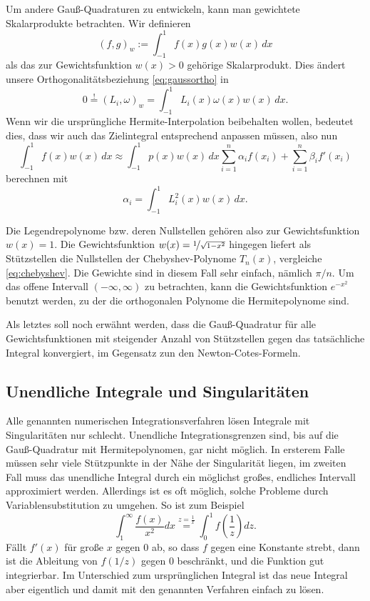 Um andere Gauß-Quadraturen zu entwickeln, kann man gewichtete
Skalarprodukte betrachten. Wir definieren
\begin{equation}
  (f,g)_w := \int_{-1}^1 f(x)g(x)w(x)\, dx
\end{equation}
als das zur Gewichtsfunktion $w(x)>0$ gehörige Skalarprodukt. Dies
ändert unsere Orthogonalitätsbeziehung \eqref{eq:gaussortho} in
\begin{equation}
  0 \stackrel{!}{=} (L_i,\omega)_w = \int_{-1}^1 L_i(x)\omega(x)w(x)\, dx.
\end{equation}
Wenn wir die ursprüngliche Hermite-Interpolation beibehalten wollen,
bedeutet dies, dass wir auch das Zielintegral entsprechend anpassen
müssen, also nun
\begin{equation}
  \int_{-1}^1 f(x) w(x)\, dx \approx \int_{-1}^1 p(x) w(x)\, dx
  \sum_{i=1}^{n} \alpha_i f(x_i) + \sum_{i=1}^{n} \beta_i f'(x_i)
\end{equation}
berechnen mit
\begin{equation}
  \alpha_i = \int_{-1}^1 L_i^2(x)w(x)\, dx.
\end{equation}

Die Legendrepolynome bzw. deren Nullstellen gehören also zur
Gewichtsfunktion $w(x)=1$. Die Gewichtsfunktion
$w(x)=\nicefrac{1}{\sqrt{1-x^2}}$ hingegen liefert als Stützstellen
die Nullstellen der Chebyshev-Polynome $T_n(x)$, vergleiche
\eqref{eq:chebyshev}. Die Gewichte sind in diesem Fall sehr einfach,
nämlich $\pi/n$. Um das offene Intervall $(-\infty,\infty)$ zu
betrachten, kann die Gewichtsfunktion $e^{-x^2}$ benutzt werden, zu
der die orthogonalen Polynome die Hermitepolynome sind.

Als letztes soll noch erwähnt werden, dass die Gauß-Quadratur für alle
Gewichtsfunktionen mit steigender Anzahl von Stützstellen gegen das
tatsächliche Integral konvergiert, im Gegensatz zun den
Newton-Cotes-Formeln.

\subsection{Unendliche Integrale und Singularitäten}

Alle genannten numerischen Integrationsverfahren lösen Integrale mit
Singularitäten nur schlecht. Unendliche Integrationsgrenzen sind, bis
auf die Gauß-Quadratur mit Hermitepolynomen, gar nicht möglich. In
ersterem Falle müssen sehr viele Stützpunkte in der Nähe der
Singularität liegen, im zweiten Fall muss das unendliche Integral
durch ein möglichst großes, endliches Intervall approximiert
werden. Allerdings ist es oft möglich, solche Probleme durch
Variablensubstitution zu umgehen.  So ist zum Beispiel
\begin{equation}
  \int_1^{\infty} \frac{f(x)}{x^2}dx \stackrel{z = \frac{1}{x}}{=}
  \int_0^1 f\left(\frac{1}{z}\right)dz.
\end{equation}
Fällt $f'(x)$ für große $x$ gegen $0$ ab, so dass $f$ gegen eine
Konstante strebt, dann ist die Ableitung von $f(1/z)$ gegen $0$
beschränkt, und die Funktion gut integrierbar. Im Unterschied zum
ursprünglichen Integral ist das neue Integral aber eigentlich und
damit mit den genannten Verfahren einfach zu lösen.

